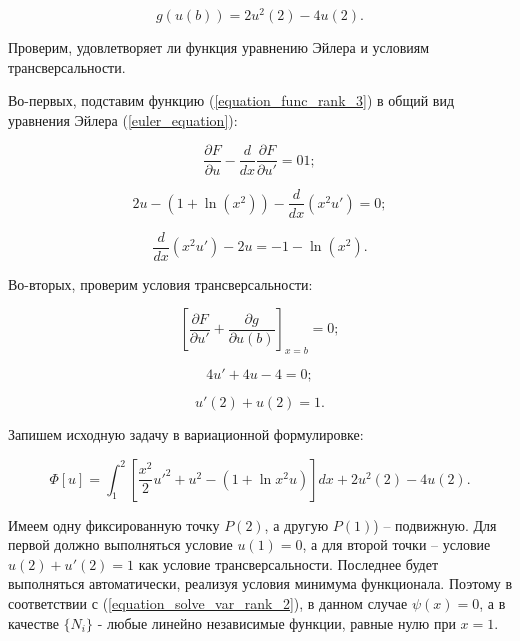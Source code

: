 \documentclass{article}
\begin{document}
\begin{displaymath}
	g(u(b)) = 2u^2(2) - 4u(2).
\end{displaymath}

\noindent Проверим, удовлетворяет ли функция уравнению Эйлера и условиям трансверсальности.

Во-первых, подставим функцию (\ref{equation_func_rank_3}) в общий вид уравнения Эйлера (\ref{euler_equation}):

\begin{displaymath}
	\frac{\partial F}{\partial u} - \frac{d}{dx} \frac{\partial F}{\partial u'} = 01;
\end{displaymath}

\begin{displaymath}
	2u - (1 + \ln(x^2)) - \frac{d}{dx}(x^2 u') = 0;
\end{displaymath}

\begin{displaymath}
	\frac{d}{dx}(x^2 u') - 2u = -1 - \ln(x^2).
\end{displaymath}

Во-вторых, проверим условия трансверсальности:

\begin{displaymath}
	\left[ \frac{\partial F}{\partial u'} + \frac{\partial g}{\partial u(b)} \right] _{x=b} = 0;
\end{displaymath}

\begin{displaymath}
	4u' + 4u - 4 = 0;
\end{displaymath}

\begin{displaymath}
	u'(2) + u(2) = 1.
\end{displaymath}

Запишем исходную задачу в вариационной формулировке:

\begin{equation}\label{equation_functional_rank_3}
	\Phi[u] = \int_{1}^{2} \left[ \frac{x^2}{2}u'^2 + u^2 - (1 + \ln{x^2}u) \right] dx + 2u^2(2) - 4u(2).
\end{equation}

Имеем одну фиксированную точку $P(2)$, а другую $P(1)$) – подвижную. Для первой должно выполняться условие $u(1) = 0$, а для второй точки – условие $u(2) + u'(2) = 1$ как условие трансверсальности. Последнее будет выполняться автоматически, реализуя условия минимума функционала. Поэтому в соответствии с (\ref{equation_solve_var_rank_2}), в данном случае $\psi(x) = 0$, а в качестве $\lbrace N_{i} \rbrace$ - любые линейно независимые функции, равные нулю при $x = 1$.
\end{document}
